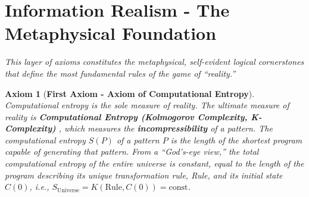 \documentclass[11pt, a4paper]{article}
\newtheorem{axiom}{Axiom}[section]
\begin{document}
\begin{abstract}
Finally, this theory proposes a series of falsifiable predictions derived from its unique emergent mechanism. The most central of these is the \textbf{``gravity-environment dependence'' of the statistical correlation of quantum entanglement} \cite{Bell1964, Bohm1952}. We argue that the apparent randomness of quantum measurements stems from the deterministic decoding of a common, unknowable ``information bit stream'' provided by the macroscopic gravitational field. This mechanism establishes an unprecedented connection between the foundations of quantum information and precision gravitational measurements. Other key predictions include: the impossibility of unifying gravity with other forces via (quantum field theory); a strict inverse relationship between the gravitational constant G and the dark energy density (cosmological constant $\Lambda$) ($G \propto 1/\Lambda$); the ``mathematical harmonic'' properties of elementary particle mass ratios; and the possibility of detecting dark matter by observing the ultra-high-energy cosmic ray spectrum produced by the ``cross-dimensional de-excitation'' of black holes.

In summary, ``Computational Realism'' depicts an impersonal, intrinsically driven \textbf{``structure solver.''} It not only aims to solve specific problems in physics but also seeks to reveal how ``reality'' as we know it ``crystallizes,'' step by step, from the simplest computational rules into a magnificent and self-consistent \textbf{dynamical structure}.
\end{abstract}

\section{Information Realism - The Metaphysical Foundation}
\textit{This layer of axioms constitutes the metaphysical, self-evident logical cornerstones that define the most fundamental rules of the game of ``reality.''}

\begin{axiom}[\textbf{First Axiom - Axiom of Computational Entropy}]
Computational entropy is the sole measure of reality.
The ultimate measure of reality is \textbf{Computational Entropy (Kolmogorov Complexity, K-Complexity)} \cite{Kolmogorov1965}, which measures the \textbf{incompressibility} of a pattern. The computational entropy $S(P)$ of a pattern $P$ is the length of the shortest program capable of generating that pattern. From a ``God's-eye view,'' the total computational entropy of the entire universe is constant, equal to the length of the program describing its unique transformation rule, Rule, and its initial state $C(0)$, i.e., $S_{\text{Universe}} = K(\text{Rule}, C(0)) = \text{const}$.
\end{axiom}
\end{document}
